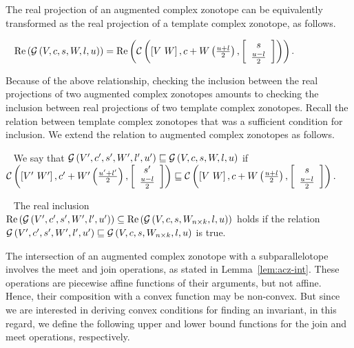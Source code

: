 The real projection of an augmented complex zonotope can be
equivalently transformed as the real projection of a template complex
zonotope, as follows.
%
\begin{lemma}~\label{lem:conversion}
$\operatorname{\operatorname{Re}}\left(\mathcal{G}\left(V,c,s,W,l,u\right)\right) = \operatorname{\operatorname{Re}}\left(\mathcal{C}\left(\left[V~W\right],c+W\left(\frac{u+l}{2}\right),\left[\begin{array}{c}{s}\\{\frac{u-l}{2}} \end{array}\right]\right)\right)$.
\end{lemma}
%
Because of the above relationship, checking the inclusion between the
real projections of two augmented complex zonotopes amounts to
checking the inclusion between real projections of two template
complex zonotopes.  Recall the relation between template complex
zonotopes that was a sufficient condition for inclusion.  We extend
the relation to augmented complex zonotopes as follows.
%
\begin{definition}~\label{defn:gcz-order}
We say that $\mathcal{G}\left(V^\prime,c^\prime,s^\prime,W^\prime,l^\prime,u^\prime\right)\sqsubseteq
\mathcal{G}\left(V,c,s,W,l,u\right)$ if\\ $\mathcal{C}\left(\left[V^\prime~W^\prime\right],c^\prime+W^\prime\left(\frac{u^\prime+l^\prime}{2}\right),\left[\begin{array}{c}{s^\prime}\\{\frac{u-l}{2}} \end{array}\right]\right)
\sqsubseteq
\mathcal{C}\left(\left[V~W\right],c+W\left(\frac{u+l}{2}\right),\left[\begin{array}{c}{s}\\{\frac{u-l}{2}} \end{array}\right]\right).$
\end{definition}
%
\begin{lemma}~\label{lem:gcz-gcz} The real inclusion\\
$\operatorname{\operatorname{Re}}\left(\mathcal{G}\left(V^\prime,c^\prime,s^\prime,W^\prime,l^\prime,u^\prime\right)\right)\subseteq \operatorname{\operatorname{Re}}\left(\mathcal{G}\left(V,c,s,W_{n\times
k},l,u\right)\right)$ holds if the relation\\
$\mathcal{G}\left(V^\prime,c^\prime,s^\prime,W^\prime,l^\prime,u^\prime\right)\sqsubseteq \mathcal{G}\left(V,c,s,W_{n\times
k},l,u\right)$ is true.
\end{lemma}

The intersection of an augmented complex zonotope with a
subparallelotope involves the meet and join operations, as stated in
Lemma~\ref{lem:acz-int}.  These operations are piecewise affine
functions of their arguments, but not affine.  Hence, their
composition with a convex function may be non-convex.  But since we
are interested in deriving convex conditions for finding an invariant,
in this regard, we define the following upper and lower bound
functions for the join and meet operations, respectively.







